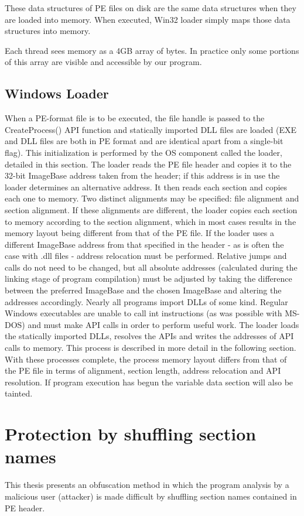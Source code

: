 \documentclass[a4paper,12pt]{article}
\begin{document}
These data structures of PE files on disk are the same data structures when
they are loaded into memory. When executed, Win32 loader simply maps those
data structures into memory.

Each thread sees memory as a 4GB array of bytes. In practice only some portions
of this array are visible and accessible by our program.

\subsection{Windows Loader}
When a PE-format file is to be executed, the file handle is passed to the
CreateProcess() API function and statically imported DLL files are loaded
(EXE and DLL files are both in PE format and are identical apart from a
single-bit flag). This initialization is performed by the OS component called
the loader, detailed in this section. The loader reads the PE file header and
copies it to the 32-bit ImageBase address taken from the header; if this 
address is in use the loader determines an alternative address. It then reads
each section and copies each one to memory. Two distinct alignments may be
specified: file alignment and section alignment. If these alignments are
different, the loader copies each section to memory according to the section
alignment, which in most cases results in the memory layout being different
from that of the PE file. If the loader uses a different ImageBase address
from that specified in the header - as is often the case with .dll files -
address relocation must be performed. Relative jumps and calls do not need to
be changed, but all absolute addresses (calculated during the linking stage
of program compilation) must be adjusted by taking the difference between
the preferred ImageBase and the chosen ImageBase and altering the addresses
accordingly. Nearly all programs import DLLs of some kind. Regular Windows
executables are unable to call int instructions (as was possible with
MS-DOS) and must make API calls in order to perform useful work. The loader
loads the statically imported DLLs, resolves the APIs and writes the
addresses of API calls to memory. This process is described in more detail
in the following section. With these processes complete, the process memory
layout differs from that of the PE file in terms of alignment, section
length, address relocation and API resolution. If program execution has begun
the variable data section will also be tainted.

\section{Protection by shuffling section names}
This thesis presents an obfuscation method in which the program analysis
by a malicious user (attacker) is made difficult by shuffling section names
contained in PE header.
\end{document}
